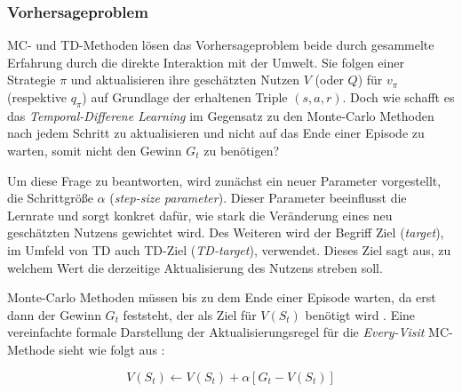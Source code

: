 \subsubsection{Vorhersageproblem}
MC- und TD-Methoden lösen das Vorhersageproblem beide durch gesammelte Erfahrung durch die direkte Interaktion mit der Umwelt. Sie folgen einer Strategie $\pi$ und aktualisieren ihre geschätzten Nutzen $V$ (oder $Q$) für $v_\pi$ (respektive $q_\pi$) auf Grundlage der erhaltenen Triple $(s,a,r)$. Doch wie schafft es das \textit{Temporal-Differene Learning} im Gegensatz zu den Monte-Carlo Methoden nach jedem Schritt zu aktualisieren und nicht auf das Ende einer Episode zu warten, somit nicht den Gewinn $G_t$ zu benötigen?
\par 
Um diese Frage zu beantworten, wird zunächst ein neuer Parameter vorgestellt, die Schrittgröße $\alpha$ (\textit{step-size parameter}). Dieser Parameter beeinflusst die Lernrate und sorgt konkret dafür, wie stark die Veränderung eines neu geschätzten Nutzens gewichtet wird. Des Weiteren wird der Begriff \glqq Ziel\grqq{} (\textit{target}), im Umfeld von TD auch TD-Ziel (\textit{TD-target}), verwendet. Dieses Ziel sagt aus, zu welchem Wert die derzeitige Aktualisierung des Nutzens streben soll.
\par 
Monte-Carlo Methoden müssen bis zu dem Ende einer Episode warten, da erst dann der Gewinn $G_t$ feststeht, der als Ziel für $V(S_t)$ benötigt wird \cite[S.~119]{Sutton1998}. Eine vereinfachte formale Darstellung der Aktualisierungsregel für die \textit{Every-Visit} MC-Methode sieht wie folgt aus \cite[S.~119]{Sutton1998}:

\begin{equation}
    V(S_t) \gets V(S_t) + \alpha \left[G_t - V(S_t)\right]
\end{equation}

